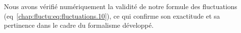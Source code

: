 {\medskip

Nous avons vérifié numériquement la validité de notre formule des fluctuations (eq~\eqref{chap:fluctu:eq:fluctuations.10}), ce qui confirme son exactitude et sa pertinence dans le cadre du formalisme développé.
}

%
%





